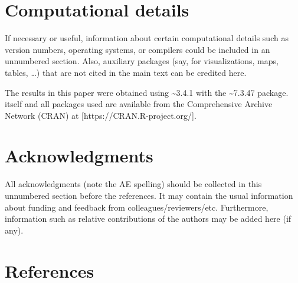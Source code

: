 \documentclass[
  nojss,
  article]{jss}
\begin{document}
\section*{Computational details}\label{computational-details}

\begin{tcolorbox}[enhanced jigsaw, bottomrule=.15mm, breakable, toprule=.15mm, opacityback=0, colframe=quarto-callout-color-frame, left=2mm, rightrule=.15mm, arc=.35mm, leftrule=.75mm, colback=white]

If necessary or useful, information about certain computational details
such as version numbers, operating systems, or compilers could be
included in an unnumbered section. Also, auxiliary packages (say, for
visualizations, maps, tables, \ldots) that are not cited in the main
text can be credited here.

\end{tcolorbox}

The results in this paper were obtained using
\textasciitilde3.4.1 with the
\textasciitilde7.3.47 package.  itself and all
packages used are available from the Comprehensive  Archive
Network (CRAN) at {[}https://CRAN.R-project.org/{]}.

\section*{Acknowledgments}\label{acknowledgments}

\begin{tcolorbox}[enhanced jigsaw, bottomrule=.15mm, breakable, toprule=.15mm, opacityback=0, colframe=quarto-callout-color-frame, left=2mm, rightrule=.15mm, arc=.35mm, leftrule=.75mm, colback=white]

All acknowledgments (note the AE spelling) should be collected in this
unnumbered section before the references. It may contain the usual
information about funding and feedback from colleagues/reviewers/etc.
Furthermore, information such as relative contributions of the authors
may be added here (if any).

\end{tcolorbox}

\section*{References}\label{references}
\end{document}
